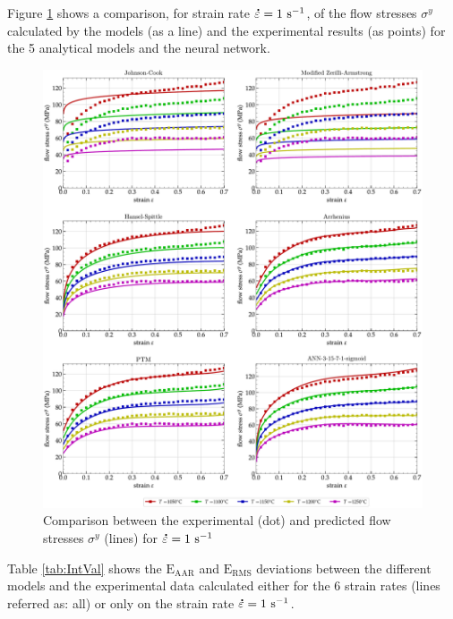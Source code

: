 \documentclass[twoside,english,1p,final,sort&compress]{elsarticle}
\theoremstyle{plain}
\DeclareRobustCommand{\mdot}[1]{\accentset{\mbox{\bfseries .}}{#1}}
\DeclareRobustCommand{\RMSE}{\text{E}_\text{RMS}}
\DeclareRobustCommand{\AARE}{\text{E}_\text{AAR}}
\DeclareRobustCommand{\ps}{\text{s}^{-1}}
\begin{document}
Figure \ref{fig:CompInt} shows a comparison, for strain rate $\mdot\varepsilon=1~\ps$, of the flow stresses $\sigma^y$ calculated by the models (as a line) and the experimental results (as points) for the 5 analytical models and the neural network.
\begin{figure}[!ht]
\centering
\includegraphics[width=\columnwidth]
{Figures/CompInt}
\caption{Comparison between the experimental (dot) and predicted flow stresses $\sigma^y$ (lines) for $\mdot\varepsilon=1~\ps$}
\label{fig:CompInt}
\end{figure}
Table \ref{tab:IntVal} shows the $\AARE$ and $\RMSE$ deviations between the different models and the experimental data calculated either for the 6 strain rates (lines referred as: all) or only on the strain rate $\mdot\varepsilon=1~\ps$.
\end{document}
